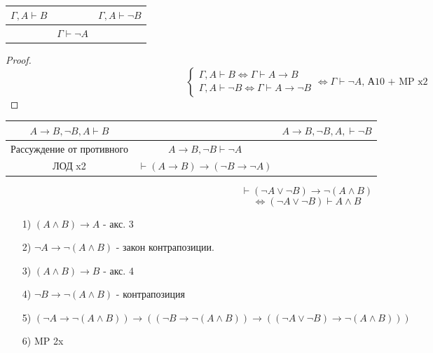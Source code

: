 \begin{lemma}
  ~\newline
\begin{center}
\begin{tabular}{ c c c } 
  $\Gamma, A \vdash B$ & & $\Gamma, A \vdash \neg B$ \\
 \hline
                       & $\Gamma \vdash \neg A$ & 
\end{tabular}
\end{center}
\end{lemma}
\begin{proof}
\[
  \begin{cases}
\Gamma, A \vdash B \iff \Gamma \vdash A \rightarrow B \\
\Gamma, A \vdash \neg B \iff \Gamma \vdash A \rightarrow \neg B  
  \end{cases} \iff \Gamma \vdash \neg A  \text{, А10 + MP x2}
\]
\end{proof}
\begin{example}
\begin{center}
\begin{tabular}{ c c c } 
  $A \rightarrow B, \neg B, A \vdash B$ & & $A \rightarrow B, \neg B, A, \vdash \neg B$\\
 \hline Рассуждение от противного
 & $A \rightarrow B, \neg B \vdash \neg A$ &  \\
 \hline ЛОД x2
 & $\vdash (A \rightarrow B) \rightarrow (\neg B \rightarrow \neg A)$ & 
\end{tabular}
\end{center}
\end{example}
\begin{example}
\[
\vdash (\neg A \lor \neg B) \rightarrow \neg (A \land B)
\] 
\[
\iff (\neg A \lor \neg B) \vdash A \land B
\]
\begin{itemize}
  \item [1) ] $(A \land B) \rightarrow A$ - акс. 3
  \item [2) ] $\neg A \rightarrow \neg(A \land B)$ - закон контрапозиции.
  \item [3) ] $(A \land B) \rightarrow B$ - акс. 4
  \item [4) ] $\neg B \rightarrow \neg(A \land B)$ - контрапозиция
  \item [5) ] $(\neg A \rightarrow \neg(A \land B)) \rightarrow ((\neg B \rightarrow \neg (A \land B)) \rightarrow ((\neg A \lor \neg B) \rightarrow \neg (A \land B)))$
  \item [6)] MP 2x
\end{itemize}
\end{example}
